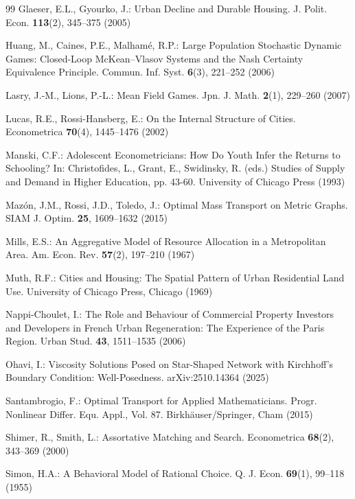 \documentclass[smallextended,referee,envcountsect,]{svjour3}
\begin{document}
\begin{thebibliography}{99}
Glaeser, E.L., Gyourko, J.:
Urban Decline and Durable Housing.
J. Polit. Econ. \textbf{113}(2), 345--375 (2005)

Huang, M., Caines, P.E., Malham\'e, R.P.:
Large Population Stochastic Dynamic Games: Closed-Loop McKean--Vlasov Systems and the Nash Certainty Equivalence Principle.
Commun. Inf. Syst. \textbf{6}(3), 221--252 (2006)

Lasry, J.-M., Lions, P.-L.:
Mean Field Games.
Jpn. J. Math. \textbf{2}(1), 229--260 (2007)

Lucas, R.E., Rossi-Hansberg, E.:
On the Internal Structure of Cities.
Econometrica \textbf{70}(4), 1445--1476 (2002)

Manski, C.F.:
Adolescent Econometricians: How Do Youth Infer the Returns to Schooling?
In: Christofides, L., Grant, E., Swidinsky, R. (eds.)
Studies of Supply and Demand in Higher Education, pp. 43-60.
University of Chicago Press (1993)

Maz\'on, J.M., Rossi, J.D., Toledo, J.:
Optimal Mass Transport on Metric Graphs.
SIAM J. Optim. \textbf{25}, 1609--1632 (2015)

Mills, E.S.:
An Aggregative Model of Resource Allocation in a Metropolitan Area.
Am. Econ. Rev. \textbf{57}(2), 197--210 (1967)

Muth, R.F.:
Cities and Housing: The Spatial Pattern of Urban Residential Land Use.
University of Chicago Press, Chicago (1969)

Nappi-Choulet, I.:
The Role and Behaviour of Commercial Property Investors and Developers in French Urban Regeneration: The Experience of the Paris Region.
Urban Stud. \textbf{43}, 1511--1535 (2006)

Ohavi, I.:
Viscosity Solutions Posed on Star-Shaped Network with Kirchhoff's Boundary Condition: Well-Posedness.
arXiv:2510.14364 (2025)

Santambrogio, F.:
Optimal Transport for Applied Mathematicians.
Progr. Nonlinear Differ. Equ. Appl., Vol. 87.
Birkh\"auser/Springer, Cham (2015)

Shimer, R., Smith, L.:
Assortative Matching and Search.
Econometrica \textbf{68}(2), 343--369 (2000)

Simon, H.A.:
A Behavioral Model of Rational Choice.
Q. J. Econ. \textbf{69}(1), 99--118 (1955)


\end{thebibliography}
\end{document}
